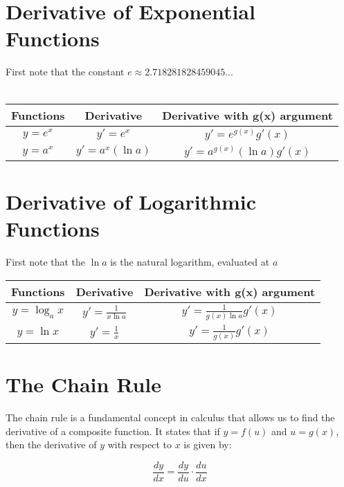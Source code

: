 \section{Derivative of Exponential Functions}
\noindent First note that the constant $e \approx 2.718281828459045...$\\\\

\begin{center}
\begin{tabular}{|c|c|c|}
  \hline
  \textbf{Functions} & \textbf{Derivative} & \textbf{Derivative with g(x) argument} \\
  \hline
  $y = e^x$ & $y'=e^x$ & $y' = e^{g(x)}g'(x)$ \\
  \hline
  $y = a^x$ & $y'=a^x(\ln a)$ & $y'=a^{g(x)}(\ln a)g'(x)$\\
  \hline
\end{tabular}
\end{center}


\section{Derivative of Logarithmic Functions}
\noindent First note that the $\ln a$ is the natural logarithm, evaluated at $a$

\begin{center}
\begin{tabular}{|c|c|c|}
  \hline
  \textbf{Functions} & \textbf{Derivative} & \textbf{Derivative with g(x) argument} \\
  \hline
  $y = \log_ax$ & $y'= \frac{1}{x \ln a}$ & $y' = \frac{1}{g(x)\ln a} g'(x)$ \\
  \hline
  $y = \ln x$ & $y'= \frac{1}{x}$ & $y'= \frac{1}{g(x)} g'(x)$\\
  \hline
\end{tabular}
\end{center}


\section{The Chain Rule}

The chain rule is a fundamental concept in calculus that allows us to find the derivative of a composite function. It states that if $y = f(u)$ and $u = g(x)$, then the derivative of $y$ with respect to $x$ is given by:

\begin{equation}
\frac{dy}{dx} = \frac{dy}{du} \cdot \frac{du}{dx}
\end{equation}


